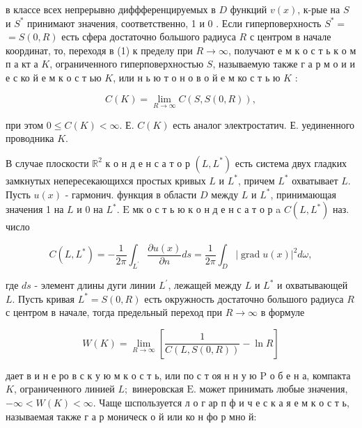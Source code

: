 \documentclass[10pt]{article}
\begin{document}
в классе всех непрерывно диффференцируемых в $D$ функций $v(x)$, к-рые на $S$ и $S^{*}$ принимают значения, соответственно, 1 и 0 . Если гиперповерхность $S^{*}=$ $=S(0, R)$ есть сфера достаточно большого радиуса $R$ с центром в начале координат, то, переходя в (1) к пределу при $R \rightarrow \infty$, получают е м к о с т ь к о м п а кт а $K$, ограниченного гиперповерхностью $S$, называемую также г а р м о и и е с ко й е м к о с т ью $K$, или н ь ю т о н о в о й е м ко с т ь ю $K$ :



\[

C(K)=\lim _{R \rightarrow \infty} C(S, S(0, R)),

\]



при этом $0 \leqslant C(K)<\infty$. Е. $C(K)$ есть аналог электростатич. Е. уединенного проводника $K$.



В случае плоскости $\mathbb{R}^{2}$ к о н д е н с а т о р $\left(L, L^{*}\right)$ есть система двух гладких замкнутых непересекающихся простых кривых $L$ и $L^{*}$, причем $L^{*}$ охватывает $L$. Пусть $u(x)$ - гармонич. функция в области $D$ между $L$ и $L^{*}$, принимающая значения 1 на $L$ и 0 на $L^{*}$. $\mathrm{E}$ мк о с т ь ю к о н д е н с а т о р a $C\left(L, L^{*}\right)$ наз. число



\[

C\left(L, L^{*}\right)=-\frac{1}{2 \pi} \int_{L^{\prime}} \frac{\partial u(x)}{\partial n} d s=\frac{1}{2 \pi} \int_{D}|\operatorname{grad} u(x)|^{2} d \omega,

\]



где $d s$ - элемент длины дуги линии $L^{\prime}$, лежащей между $L$ и $L^{*}$ и охватывающей $L$. Пусть кривая $L^{*}=S(0, R)$ есть окружность достаточно большого радиуса $R$ с центром в начале, тогда предельный переход при $R \rightarrow \infty$ в формуле



\[

W(K)=\lim _{R \rightarrow \infty}\left[\frac{1}{C(L, S(0, R))}-\ln R\right]

\]



дает в и н е ро в с к у ю м к о с т ь, или по с т оя н н у ю $\mathrm{P}$ о б е н а, компакта $K$, ограниченного линией $L ;$ винеровская $\mathrm{E}$. может принимать любые значения, $-\infty<W(K)<\infty$. Чаще шспользуется л о г ар п ф и ч е с к а я е м к о с т ь, называемая также г а р моническ о й или ко н фо р мно й:
\end{document}

